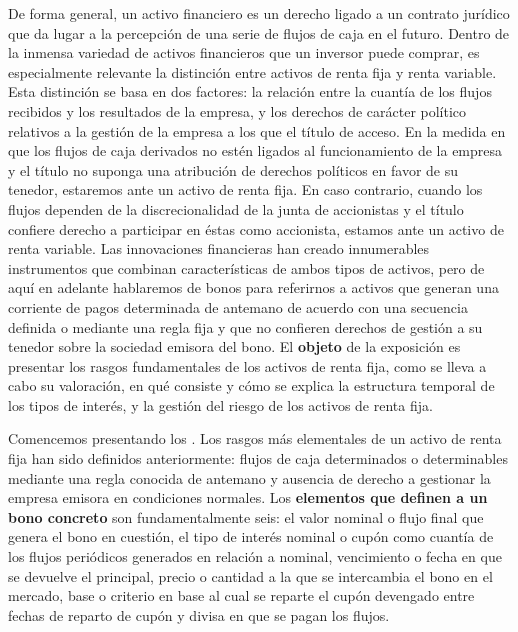 \documentclass{nuevotema}
\begin{document}
\ideaclave

De forma general, un activo financiero es un derecho ligado a un contrato jurídico que da lugar a la percepción de una serie de flujos de caja en el futuro. Dentro de la inmensa variedad de activos financieros que un inversor puede comprar, es especialmente relevante la distinción entre activos de renta fija y renta variable. Esta distinción se basa en dos factores: la relación entre la cuantía de los flujos recibidos y los resultados de la empresa, y los derechos de carácter político relativos a la gestión de la empresa a los que el título de acceso. En la medida en que los flujos de caja derivados no estén ligados al funcionamiento de la empresa y el título no suponga una atribución de derechos políticos en favor de su tenedor, estaremos ante un activo de renta fija. En caso contrario, cuando los flujos dependen de la discrecionalidad de la junta de accionistas y el título confiere derecho a participar en éstas como accionista, estamos ante un activo de renta variable. Las innovaciones financieras han creado innumerables instrumentos que combinan características de ambos tipos de activos, pero de aquí en adelante hablaremos de bonos para referirnos a activos que generan una corriente de pagos determinada de antemano de acuerdo con una secuencia definida o mediante una regla fija y que no confieren derechos de gestión a su tenedor sobre la sociedad emisora del bono. El \textbf{objeto} de la exposición es presentar los rasgos fundamentales de los activos de renta fija, como se lleva a cabo su valoración, en qué consiste y cómo se explica la estructura temporal de los tipos de interés, y la gestión del riesgo de los activos de renta fija.

Comencemos presentando los . Los rasgos más elementales de un activo de renta fija han sido definidos anteriormente: flujos de caja determinados o determinables mediante una regla conocida de antemano y ausencia de derecho a gestionar la empresa emisora en condiciones normales. Los \textbf{elementos que definen a un bono concreto} son fundamentalmente seis: el valor nominal o flujo final que genera el bono en cuestión, el tipo de interés nominal o cupón como cuantía de los flujos periódicos generados en relación a nominal, vencimiento o fecha en que se devuelve el principal, precio o cantidad a la que se intercambia el bono en el mercado, base o criterio en base al cual se reparte el cupón devengado entre fechas de reparto de cupón y divisa en que se pagan los flujos. 
\end{document}
